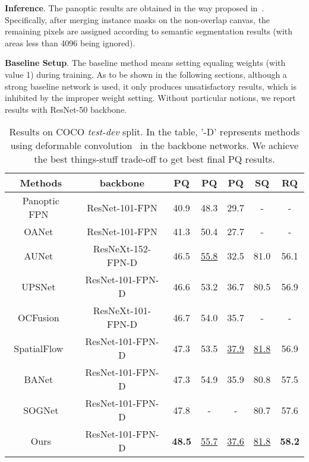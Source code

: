 \documentclass[letterpaper]{article} \usepackage{aaai21}  \usepackage{times}  \usepackage{helvet} \usepackage{courier}  \usepackage[hyphens]{url}  \usepackage{graphicx} \urlstyle{rm} \def\UrlFont{\rm}  \usepackage{natbib}  \usepackage{caption} \frenchspacing  \setlength{\pdfpagewidth}{8.5in}  \setlength{\pdfpageheight}{11in}
\begin{document}
 \noindent
 \textbf{Inference}. The panoptic results are obtained 
 in the way proposed in~\cite{panoptic_segmentation}.
Specifically, after merging instance masks on the non-overlap canvas, the remaining pixels
 are assigned according to semantic segmentation results (with areas less than 4096 being ignored). 
 
 \noindent
 \textbf{Baseline Setup}. The baseline method means 
setting equaling weights (with value 1) during training. 
 As to be shown in the following sections, although a strong baseline network is used, 
 it only produces unsatisfactory results, which is inhibited by the improper weight setting.
 Without particular notions, we report results with ResNet-50 backbone.









\begin{table*}
  \begin{centering}
\tabcolsep 0.1in{\scriptsize{}}\begin{tabular}{c|c|ccc|cc}
  \hline 
  Methods & backbone & PQ & PQ & PQ & SQ & RQ\tabularnewline
  \hline 
  \hline 
Panoptic FPN~\cite{panopticFPNkirillov2019} & ResNet-101-FPN & 40.9 & 48.3 & 29.7 & - & -\tabularnewline
  OANet~\cite{oanetLiu2019} & ResNet-101-FPN & 41.3 & 50.4 & 27.7 & - & -\tabularnewline
AUNet~\cite{AunetLi_2019_} & ResNeXt-152-FPN-D & 46.5 & \underline{55.8} & 32.5 & 81.0 & 56.1\tabularnewline
  UPSNet~\cite{upsnetxiong2019} & ResNet-101-FPN-D & 46.6 & 53.2 & 36.7 & 80.5 & 56.9\tabularnewline
  OCFusion~\cite{lazarow2020learningocfusion} & ResNeXt-101-FPN-D & 46.7 & 54.0 & 35.7 & - & -\tabularnewline 
  SpatialFlow~\cite{spatialflowchen2019} & ResNet-101-FPN-D & 47.3 & 53.5 & \underline{37.9} & \underline{81.8} & 56.9\tabularnewline
  BANet~\cite{chen2020banet} & ResNet-101-FPN-D & 47.3 & 54.9 & 35.9 & 80.8 & 57.5\tabularnewline
  SOGNet\cite{yang2019sognet} & ResNet-101-FPN-D & 47.8 & - & - & 80.7 & 57.6\tabularnewline
  \hline 
  Ours & ResNet-101-FPN-D & \textbf{48.5} & \underline{55.7} & \underline{37.6} & \underline{81.8} & \textbf{58.2} \tabularnewline
  \hline 
  \end{tabular}{\scriptsize\par}
  \par\end{centering}


  \caption{\label{tab:Results on COCO test-dev} Results on COCO \textit{test-dev} split. 
  In the table, '-D' represents methods using deformable convolution~\cite{zhu2019deformablev2} in the backbone networks. 
We achieve the best things-stuff trade-off to get best final PQ results.}
\end{table*}
\end{document}
